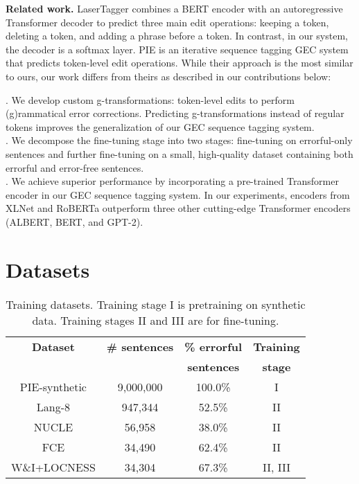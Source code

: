 \documentclass[11pt,a4paper]{article}
\begin{document}
\textbf{Related work.} LaserTagger \cite{malmi-etal-2019-encode} combines a BERT encoder with an autoregressive Transformer decoder to predict three main edit operations: keeping a token, deleting a token, and adding a phrase before a token. In contrast, in our system, the decoder is a softmax layer. PIE \cite{awasthi-etal-2019-parallel} is an iterative sequence tagging GEC system that predicts token-level edit operations. While their approach is the most similar to ours, our work differs from theirs as described in our contributions below:

. We develop custom g-transformations: token-level edits to perform (g)rammatical error corrections. Predicting g-transformations instead of regular tokens improves the generalization of our GEC sequence tagging system. \\
. We decompose the fine-tuning stage into two stages: fine-tuning on errorful-only sentences and further fine-tuning on a small, high-quality  dataset containing both errorful and error-free sentences. \\
. We achieve superior performance by incorporating a pre-trained Transformer encoder in our GEC sequence tagging system. In our experiments, encoders from XLNet and RoBERTa outperform three other cutting-edge Transformer encoders (ALBERT, BERT, and GPT-2). \\

\section{Datasets}

\begin{table}
\footnotesize
\centering
\begin{tabular}{cccc}
\hline 
\textbf{Dataset}  & \textbf{\# sentences}  &\textbf{\% errorful} & \textbf{Training} \\
                 &                         &\textbf{sentences}   & \textbf{stage} \\
\hline 
PIE-synthetic & 9,000,000 & 100.0\% & I \\
Lang-8 & 947,344 & 52.5\% & II \\
NUCLE & 56,958 & 38.0\% & II \\
FCE & 34,490 & 62.4\% & II \\
W\&I+LOCNESS & 34,304 & 67.3\% & II, III  \\
\hline
\end{tabular}
\caption{\label{training-data-table} Training datasets. Training stage I is pretraining on synthetic data. Training stages II and III are for fine-tuning.}
\end{table}
\end{document}
